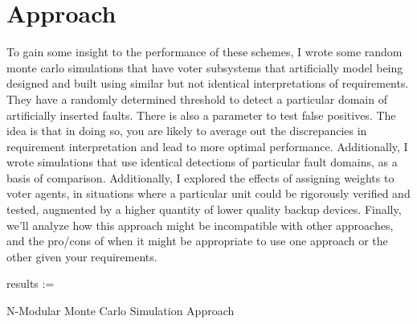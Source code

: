 \documentclass[article]{IEEEtran}
\begin{document}
\section{Approach}
To gain some insight to the performance of these schemes, I wrote some random monte carlo simulations that have voter subsystems that artificially model being designed and built using similar but not identical interpretations of requirements. They have a randomly determined threshold to detect a particular domain of artificially inserted faults. There is also a parameter to test false positives. The idea is that in doing so, you are likely to average out the discrepancies in requirement interpretation and lead to more optimal performance. Additionally, I wrote simulations that use identical detections of particular fault domains, as a basis of comparison.  Additionally, I explored the effects of assigning weights to voter agents, in situations where a particular unit could be rigorously verified and tested, augmented by a higher quantity of lower quality backup devices. Finally, we'll analyze how this approach might be incompatible with other approaches, and the pro/cons of when it might be appropriate to use one approach or the other given your requirements. 

\begin{algorithm}
    results := 
    \caption{N-Modular Monte Carlo Simulation Approach}
\end{algorithm}
\end{document}
